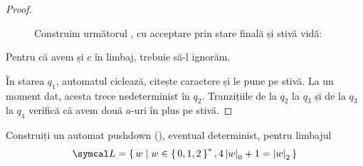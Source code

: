 \begin{proof}~
    \begin{figure}[H]
        \centering
        \caption*{Construim următorul \pda{}, cu acceptare prin stare finală și stivă vidă:}
    \end{figure}

    Pentru că avem și \(c\) în limbaj, trebuie să-l ignorăm.

    În starea \(q_1\), automatul ciclează, citește caractere și le pune pe stivă. La un moment dat, acesta trece nedeterminist în \(q_2\). Tranzițiile de la \(q_2\) la \(q_3\) și de la \(q_3\) la \(q_4\) verifică că avem două \(a\)-uri în plus pe stivă.
\end{proof}

\begin{exercise}
    Construiți un automat pushdown (\pda{}), eventual determinist, pentru limbajul
    \[
        \limbaj = \set{ w | w \in \set{0, 1, 2}^*, 4\abs{w}_0 + 1 = \abs{w}_2 }
    \]
\end{exercise}

